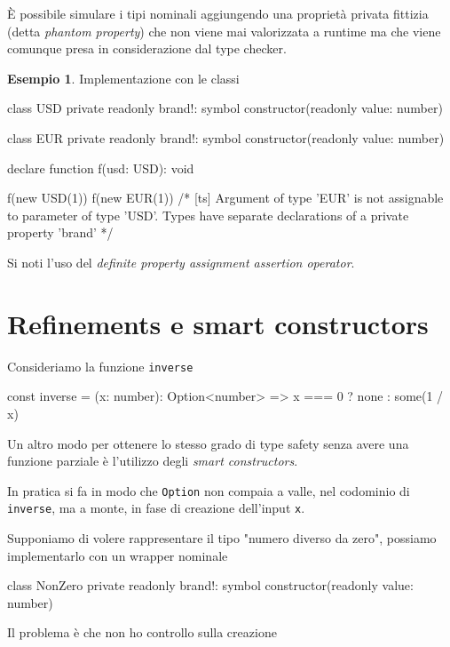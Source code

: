 \documentclass[12pt]{article}
\theoremstyle{definition}
\newtheorem{example}{Esempio}[subsection]
\newenvironment{code}
  {\vspace{0.5cm} \VerbatimEnvironment\begin{typescriptcode}}
  {\end{typescriptcode} \vspace{0.2cm}}
\begin{document}
È possibile simulare i tipi nominali aggiungendo una proprietà privata fittizia (detta \emph{phantom property}) che non viene mai valorizzata
a runtime ma che viene comunque presa in considerazione dal type checker.

\begin{example}
Implementazione con le classi

\begin{code}
class USD {
  private readonly brand!: symbol
  constructor(readonly value: number) {}
}

class EUR {
  private readonly brand!: symbol
  constructor(readonly value: number) {}
}

declare function f(usd: USD): void

f(new USD(1))
f(new EUR(1))
/*
[ts]
Argument of type 'EUR' is not assignable to parameter
of type 'USD'. Types have separate declarations of a
private property 'brand'
*/
\end{code}
\end{example}

Si noti l'uso del \emph{definite property assignment assertion operator}.

\newpage
\section{Refinements e smart constructors}

Consideriamo la funzione \texttt{inverse}

\begin{code}
const inverse = (x: number): Option<number> =>
  x === 0 ? none : some(1 / x)
\end{code}

Un altro modo per ottenere lo stesso grado di type safety senza avere una funzione parziale è l'utilizzo degli \emph{smart constructors}.

In pratica si fa in modo che \texttt{Option} non compaia a valle, nel codominio di \texttt{inverse},
ma a monte, in fase di creazione dell'input \texttt{x}.

Supponiamo di volere rappresentare il tipo "numero diverso da zero", possiamo implementarlo con un wrapper nominale

\begin{code}
class NonZero {
  private readonly brand!: symbol
  constructor(readonly value: number) {}
}
\end{code}

Il problema è che non ho controllo sulla creazione
\end{document}
